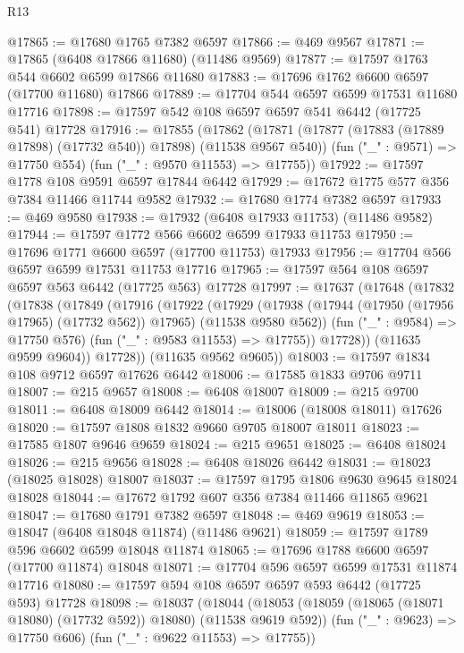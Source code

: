 \begin{lexlean}{R13}
\begin{coremodule}
@17865 := @17680 @1765 @7382 @6597
@17866 := @469 @9567
@17871 := @17865 (@6408 @17866 @11680) (@11486 @9569)
@17877 := @17597 @1763 @544 @6602 @6599 @17866 @11680
@17883 := @17696 @1762 @6600 @6597 (@17700 @11680) @17866
@17889 := @17704 @544 @6597 @6599 @17531 @11680 @17716
@17898 := @17597 @542 @108 @6597 @6597 @541 @6442 (@17725 @541) @17728
@17916 := @17855
    (@17862
      (@17871 (@17877 (@17883 (@17889 @17898) (@17732 @540)) @17898) (@11538 @9567 @540))
      (fun ("_" : @9571) => @17750 @554)
      (fun ("_" : @9570 @11553) => @17755))
@17922 := @17597 @1778 @108 @9591 @6597 @17844 @6442
@17929 := @17672 @1775 @577 @356 @7384 @11466 @11744 @9582
@17932 := @17680 @1774 @7382 @6597
@17933 := @469 @9580
@17938 := @17932 (@6408 @17933 @11753) (@11486 @9582)
@17944 := @17597 @1772 @566 @6602 @6599 @17933 @11753
@17950 := @17696 @1771 @6600 @6597 (@17700 @11753) @17933
@17956 := @17704 @566 @6597 @6599 @17531 @11753 @17716
@17965 := @17597 @564 @108 @6597 @6597 @563 @6442 (@17725 @563) @17728
@17997 := @17637
    (@17648
      (@17832
        (@17838
          (@17849
            (@17916
              (@17922
                (@17929
                  (@17938
                    (@17944 (@17950 (@17956 @17965) (@17732 @562)) @17965)
                    (@11538 @9580 @562))
                  (fun ("_" : @9584) => @17750 @576)
                  (fun ("_" : @9583 @11553) => @17755))
                @17728))
            (@11635 @9599 @9604))
          @17728))
      (@11635 @9562 @9605))
@18003 := @17597 @1834 @108 @9712 @6597 @17626 @6442
@18006 := @17585 @1833 @9706 @9711
@18007 := @215 @9657
@18008 := @6408 @18007
@18009 := @215 @9700
@18011 := @6408 @18009 @6442
@18014 := @18006 (@18008 @18011) @17626
@18020 := @17597 @1808 @1832 @9660 @9705 @18007 @18011
@18023 := @17585 @1807 @9646 @9659
@18024 := @215 @9651
@18025 := @6408 @18024
@18026 := @215 @9656
@18028 := @6408 @18026 @6442
@18031 := @18023 (@18025 @18028) @18007
@18037 := @17597 @1795 @1806 @9630 @9645 @18024 @18028
@18044 := @17672 @1792 @607 @356 @7384 @11466 @11865 @9621
@18047 := @17680 @1791 @7382 @6597
@18048 := @469 @9619
@18053 := @18047 (@6408 @18048 @11874) (@11486 @9621)
@18059 := @17597 @1789 @596 @6602 @6599 @18048 @11874
@18065 := @17696 @1788 @6600 @6597 (@17700 @11874) @18048
@18071 := @17704 @596 @6597 @6599 @17531 @11874 @17716
@18080 := @17597 @594 @108 @6597 @6597 @593 @6442 (@17725 @593) @17728
@18098 := @18037
    (@18044
      (@18053 (@18059 (@18065 (@18071 @18080) (@17732 @592)) @18080) (@11538 @9619 @592))
      (fun ("_" : @9623) => @17750 @606)
      (fun ("_" : @9622 @11553) => @17755))

\end{coremodule}
\end{lexlean}
